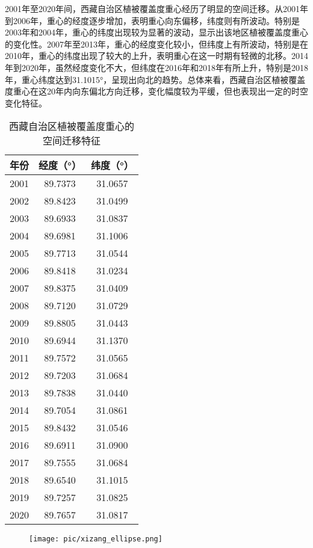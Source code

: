 \documentclass{article}
\begin{document}
		2001年至2020年间，西藏自治区植被覆盖度重心经历了明显的空间迁移。从2001年到2006年，重心的经度逐步增加，表明重心向东偏移，纬度则有所波动。特别是2003年和2004年，重心的纬度出现较为显著的波动，显示出该地区植被覆盖度重心的变化性。2007年至2013年，重心的经度变化较小，但纬度上有所波动，特别是在2010年，重心的纬度出现了较大的上升，表明重心在这一时期有轻微的北移。2014年到2020年，虽然经度变化不大，但纬度在2016年和2018年有所上升，特别是2018年，重心纬度达到31.1015°，呈现出向北的趋势。总体来看，西藏自治区植被覆盖度重心在这20年内向东偏北方向迁移，变化幅度较为平缓，但也表现出一定的时空变化特征。
		
		\begin{table}[H]
			\centering
			\begin{tabular}{|c|c|c|}
				\hline
				年份 & 经度（°） & 纬度（°） \\
				\hline
				2001 & 89.7373 & 31.0657 \\
				2002 & 89.8423 & 31.0499 \\
				2003 & 89.6933 & 31.0837 \\
				2004 & 89.6981 & 31.1006 \\
				2005 & 89.7713 & 31.0544 \\
				2006 & 89.8418 & 31.0234 \\
				2007 & 89.8375 & 31.0409 \\
				2008 & 89.7120 & 31.0729 \\
				2009 & 89.8805 & 31.0443 \\
				2010 & 89.6944 & 31.1370 \\
				2011 & 89.7572 & 31.0565 \\
				2012 & 89.7203 & 31.0684 \\
				2013 & 89.7838 & 31.0440 \\
				2014 & 89.7054 & 31.0861 \\
				2015 & 89.8432 & 31.0546 \\
				2016 & 89.6911 & 31.0900 \\
				2017 & 89.7555 & 31.0684 \\
				2018 & 89.6540 & 31.1015 \\
				2019 & 89.7257 & 31.0825 \\
				2020 & 89.7657 & 31.0817 \\
				\hline
			\end{tabular}
			\caption{西藏自治区植被覆盖度重心的空间迁移特征}
		\end{table}
		\begin{figure}[H]  %
			\centering
			\texttt{[image: pic/xizang\_ellipse.png]} %
		\end{figure}
		
\end{document}
